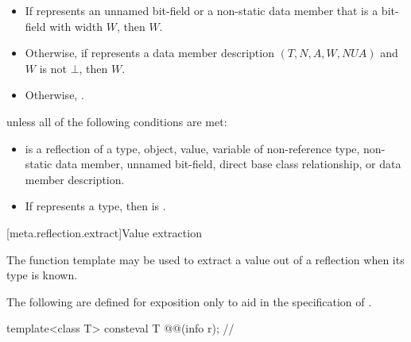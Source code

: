 \begin{itemdescr}
\pnum
\returns
\begin{itemize}
\item
  If  represents
  an unnamed bit-field
  or a non-static data member that is a bit-field
  with width $W$,
  then $W$.
\item
  Otherwise, if  represents a data member description
  $(T, N, A, W, \mathit{NUA})$
  and $W$ is not $\bot$,
  then $W$.
\item
  Otherwise, .
\end{itemize}

\pnum
\throws
{} unless
all of the following conditions are met:
\begin{itemize}
\item
{} is a reflection of a
type,
object,
value,
variable of non-reference type,
non-static data member,
unnamed bit-field,
direct base class relationship, or
data member description.
\item
If  represents a type,
then  is .
\end{itemize}
\end{itemdescr}

[meta.reflection.extract]{Value extraction}

\pnum
The  function template may be used
to extract a value out of a reflection when its type is known.

\pnum
The following are defined for exposition only
to aid in the specification of .

\begin{itemdecl}
template<class T>
  consteval T @@(info r);      // \expos
\end{itemdecl}

